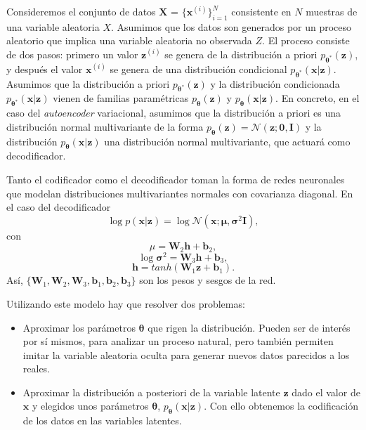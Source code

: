 Consideremos el conjunto de datos $\textbf{X}$ = $\{\textbf{x}^{(i)}\}^N_{i=1}$ consistente en $N$ muestras de una variable aleatoria $X$. Asumimos que los datos son generados por un proceso aleatorio que implica una variable aleatoria no observada $Z$. El proceso consiste de dos pasos: primero un valor $\textbf{z}^{(i)}$ se genera de la distribución a priori $p_{\boldsymbol{\theta}^*}(\textbf{z})$, y después el valor $\textbf{x}^{(i)}$ se genera de una distribución condicional $p_{\boldsymbol{\theta}^*}(\textbf{x}|\textbf{z})$. Asumimos que la distribución a priori $p_{\boldsymbol{\theta}^*}(\textbf{z})$ y la distribución condicionada $p_{\boldsymbol{\theta}^*}(\textbf{x}|\textbf{z})$ vienen de familias paramétricas $p_{\boldsymbol{\theta}}(\textbf{z})$ y $p_{\boldsymbol{\boldsymbol{\theta}}}(\textbf{x}|\textbf{z})$. En concreto, en el caso del \textit{autoencoder} variacional, asumimos que la distribución a priori es una distribución normal multivariante de la forma $p_{\boldsymbol{\theta}}(\textbf{z}) = \mathcal{N}(\textbf{z};\mathbf{0},\textbf{I})$ y la distribución $p_{\boldsymbol{\theta}}(\textbf{x}|\textbf{z})$ una distribución normal multivariante, que actuará como decodificador.

Tanto el codificador como el decodificador toman la forma de redes neuronales que modelan distribuciones multivariantes normales con covarianza diagonal. En el caso del decodificador $$\log p(\textbf{x}|\textbf{z}) = \log \mathcal{N}(\textbf{x}; \boldsymbol{\mu},\boldsymbol{\sigma}^2\textbf{I}),$$ con $$\mu = \textbf{W}_2\textbf{h} + \textbf{b}_2,$$ $$\log \boldsymbol{\sigma}^2 = \textbf{W}_3\textbf{h} + \textbf{b}_3,$$ $$\textbf{h} = tanh(\textbf{W}_1\textbf{z} + \textbf{b}_1).$$ Así, $\{\textbf{W}_1, \textbf{W}_2, \textbf{W}_3, \textbf{b}_1, \textbf{b}_2, \textbf{b}_3\}$ son los pesos y sesgos de la red.

Utilizando este modelo hay que resolver dos problemas:

\begin{itemize}
\item Aproximar los parámetros $\boldsymbol{\theta}$ que rigen la distribución. Pueden ser de interés por sí mismos, para analizar un proceso natural, pero también permiten imitar la variable aleatoria oculta para generar nuevos datos parecidos a los reales.
\item Aproximar la distribución a posteriori de la variable latente $\textbf{z}$ dado el valor de $\textbf{x}$ y elegidos unos parámetros $\boldsymbol{\theta}$, $p_{\boldsymbol{\theta}}(\textbf{x}|\textbf{z})$. Con ello obtenemos la codificación de los datos en las variables latentes.
\end{itemize}

